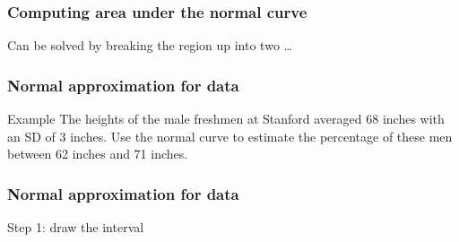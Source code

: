 \documentclass[handout]{beamer}
\begin{document}
   \begin{frame}
   \frametitle{Computing area under the normal curve}
   \begin{center}
   \end{center}
   Can be solved by breaking the region up into two \dots
   \end{frame}


   \begin{frame} \frametitle{Normal approximation for data}

   \begin{block}
   {Example}
   The heights of the male freshmen at Stanford averaged 68 inches
   with an SD of 3 inches. Use the normal curve to estimate the
   percentage of these men between 62 inches and 71 inches.
   \end{block}
   \end{frame}



   \begin{frame}
   \frametitle{Normal approximation for data}
   \begin{center}
   \end{center}
   Step 1: draw the interval
   \end{frame}

\end{document}
